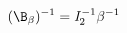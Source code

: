 \documentclass[preview]{standalone}
\begin{document}
\begin{align*}
(\B_{\beta})^{-1} =   \mathit{I}_2^{-1} \beta^{-1}
\end{align*}
\end{document}
